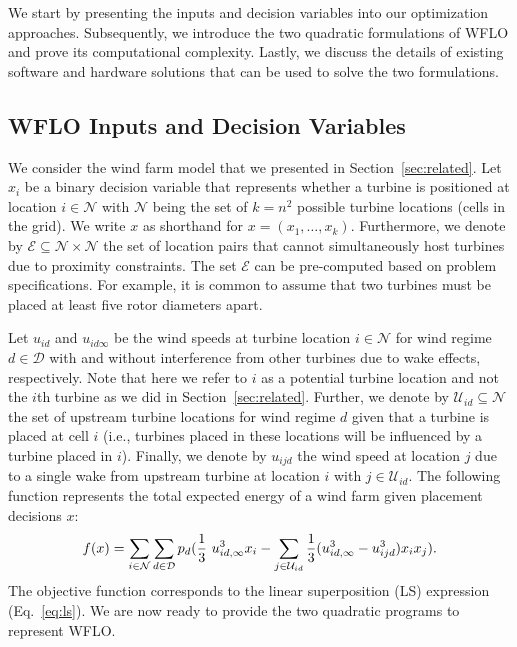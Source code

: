 \documentclass[preprint,12pt]{elsarticle}
\begin{document}
We start by presenting the inputs and decision variables into our optimization approaches.
Subsequently, we introduce the two quadratic formulations of WFLO and 
prove its computational complexity. Lastly, we discuss the details of existing
software and hardware solutions that can be used to solve the two formulations. 

\subsection{WFLO Inputs and Decision Variables} We consider the wind farm model that we presented in Section~\ref{sec:related}. 
Let $x_i$ be a binary decision variable that represents whether a 
turbine is positioned at location 
$i \in \mathcal{N}$ with $\mathcal{N}$ being the set 
of $k = n^2$ possible turbine locations (cells in the grid). We 
write $x$ as shorthand for $x = (x_1,\ldots, x_k)$. Furthermore,
we denote by $\mathcal{E} \subseteq \mathcal{N}\times \mathcal{N}$
the set of location pairs that cannot simultaneously host turbines 
due to proximity constraints. The set $\mathcal{E}$ can be pre-computed 
based on problem specifications. For example,
it is common to assume that two turbines must be placed at least five rotor diameters apart. 

Let $u_{id}$ and $u_{id\infty}$ 
be the wind speeds at turbine location $i \in \mathcal{N}$ for wind regime $d \in \mathcal{D}$
with and without interference from other turbines due to wake effects, respectively. 
Note that here we refer to $i$ as a potential turbine location and not the $i$th turbine as we did in Section~\ref{sec:related}.
Further, we denote by $\mathcal{U}_{id} \subseteq \mathcal{N}$ 
the set of upstream 
turbine locations for wind regime $d$
given that a turbine is placed at cell $i$ (i.e., turbines placed in these locations 
will be influenced by a turbine placed in $i$). Finally,
we denote by $u_{ijd}$ the wind speed at location $j$ due to a single wake from upstream turbine at location $i$ with $j \in \mathcal{U}_{id}$. 
The following function  
represents the total expected energy of a wind farm given placement decisions 
$x$: \begin{equation}
f(x) = \sum_{i \in \mathcal{N}}^{} \sum_{d \in \mathcal{D}}^{} p_d ( \frac{1}{3} \ u_{id, \infty}^3 x_i  - \sum_{j \in \mathcal{U}_{id}}^{} \frac{1}{3}(u_{id, \infty} ^3 - u_{ijd}^3)x_i x_j).   \label{ObjFunc}\\
\end{equation} The objective function corresponds to the linear superposition (LS)
expression (Eq.~\ref{eq:ls}). We are now ready to provide the two quadratic programs to represent WFLO.
\end{document}
